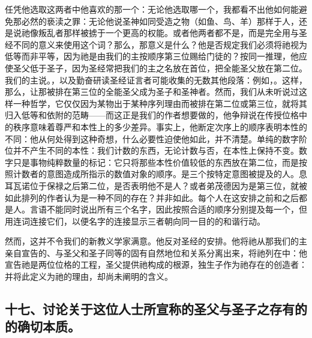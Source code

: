 任凭他选取这两者中他喜欢的那一个：无论他选取哪一个，我都看不出他如何能避免那必然的亵渎之罪：无论他说圣神如同受造之物（如鱼、鸟、羊）那样于人，还是说祂像叛乱者那样被掳于一个更高的权能。或者他两者都不是，而是完全用与圣经不同的意义来使用这个词？那么，那意义是什么？他是否规定我们必须将祂视为低等而非平等，因为祂是由我们的主按顺序第三位赐给门徒的？按同一推理，他应使圣父低于圣子，因为圣经常把我们的主之名放在首位，把全能圣父放在第二位。我们的主说。，以及勤奋研读圣经证言者可能收集的无数其他段落：例如，。这样，那么，让那被排在第三位的全能圣父成为圣子和圣神者。然而，我们从未听说过这样一种哲学，它仅仅因为某物出于某种序列理由而被排在第二位或第三位，就将其归入低等和依附的范畴——而这正是我们的作者想要做的，他争辩说在传授位格中的秩序意味着尊严和本性上的多少差异。事实上，他断定次序上的顺序表明本性的不同：他从何处得到这种奇想，什么必要性迫使他如此，并不清楚。单纯的数字阶位并不产生不同的本性：我们计数的东西，无论计数与否，在本性上保持不变。数字只是事物纯粹数量的标记：它只将那些本性价值较低的东西放在第二位，而是按照计数者的意图造成所指示的数值对象的顺序。是三个按特定意图被提及的人。息耳瓦诺位于保禄之后第二位，是否表明他不是人？或者弟茂德因为是第三位，就被如此排列的作者认为是一种不同的存在？并非如此。每个人在这安排之前和之后都是人。言语不能同时说出所有三个名字，因此按照合适的顺序分别提及每一个，但用连词连接它们，以便名字的连接显示三者朝向同一目的的和谐行动。\par

然而，这并不令我们的新教义学家满意。他反对圣经的安排。他将祂从那我们的主亲自宣告的、与圣父和圣子同等的固有自然地位和关系分离出来，将祂列在中：他宣告祂是两位位格的工程，圣父提供祂构成的根源，独生子作为祂存在的创造者：并将此定义为祂的理由，却尚未阐明的含义。\par


\subsection{十七、讨论关于这位人士所宣称的圣父与圣子之存有的的确切本质。}

